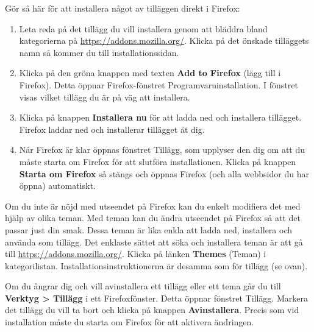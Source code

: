 \documentclass[a4paper,final]{memoir} %
\begin{document}
Gör så här för att installera något av tilläggen direkt i Firefox:

\begin{enumerate}

\item Leta reda på det tillägg du vill installera genom att bläddra bland kategorierna på \url{https://addons.mozilla.org/}. Klicka på det önskade tilläggets namn så kommer du till installationssidan.

\item Klicka på den gröna knappen med texten \textbf{Add to Firefox} (lägg till i Firefox). Detta öppnar Firefox-fönstret Programvaruinstallation. I fönstret visas vilket tillägg du är på väg att installera. 

\item Klicka på knappen \textbf{Installera nu} för att ladda ned och installera tillägget. Firefox laddar ned och installerar tillägget åt dig.

\item När Firefox är klar öppnas fönstret Tillägg, som upplyser den dig om att du måste starta om Firefox för att slutföra installationen. Klicka på knappen \textbf{Starta om Firefox} så stängs och öppnas Firefox (och alla webbsidor du har öppna) automatiskt.

\end{enumerate}

Om du inte är nöjd med utseendet på Firefox kan du enkelt modifiera det med hjälp av olika teman. Med teman kan du ändra utseendet på Firefox så att det passar just din smak. Dessa teman är lika enkla att ladda ned, installera och använda som tillägg. Det enklaste sättet att söka och installera teman är att gå till \url{https://addons.mozilla.org/}. Klicka på länken \textbf{Themes} (Teman) i kategorilistan. Installationsinstruktionerna är desamma som för tillägg (se ovan).


Om du ångrar dig och vill avinstallera ett tillägg eller ett tema går du till \textbf{Verktyg \textgreater{} Tillägg} i ett Firefoxfönster. Detta öppnar fönstret Tillägg. Markera det tillägg du vill ta bort och klicka på knappen \textbf{Avinstallera}. Precis som vid installation måste du starta om Firefox för att aktivera ändringen.


\end{document}
